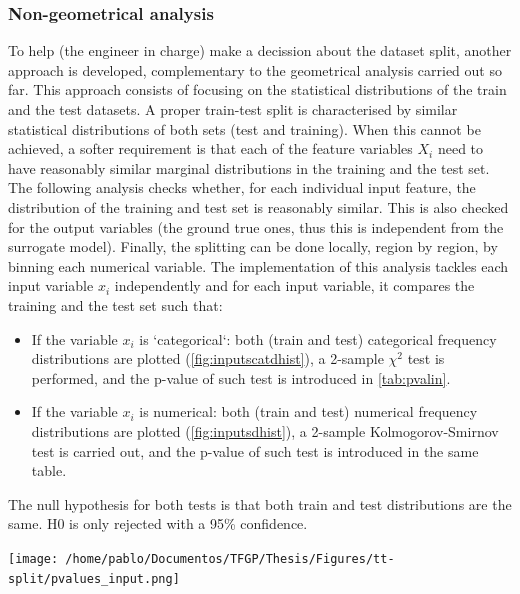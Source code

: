 \subsubsection{Non-geometrical analysis}
\indent To help (the engineer in charge) make a decission about the dataset split, another approach is developed, complementary to the geometrical analysis carried out so far. This approach consists of focusing on the statistical distributions of the train and the test datasets. A proper train-test split is characterised by similar statistical distributions of both sets (test and training)\cite{bonnasse2022interpolation}. When this cannot be achieved, a softer requirement is that each of the feature variables $X_i$ need to have reasonably similar marginal distributions in the training and the test set.\\
%
\indent The following analysis checks whether, for each individual input feature, the distribution of the training and test set is reasonably similar. This is also checked for the output variables (the ground true ones, thus this is independent from the surrogate model). Finally, the splitting can be done locally, \ie region by region, by binning each numerical variable. The implementation of this analysis tackles each input variable $x_i$ independently and for each input variable, it compares the training and the test set such that:
\begin{itemize}
	\item If the variable $x_i$ is `categorical`: both (train and test) categorical frequency distributions are plotted (\autoref{fig:inputscatdhist}), a 2-sample $\chi^2$ test\cite[p. 431]{velez1994calculo} is performed, and the p-value of such test is introduced in \autoref{tab:pvalin}.
	\item If the variable $x_i$ is numerical: both (train and test) numerical frequency distributions are plotted (\autoref{fig:inputsdhist}), a 2-sample Kolmogorov-Smirnov test\cite[p. 454]{velez1994calculo} is carried out, and the p-value of such test is introduced in the same table.\\
\end{itemize}
%
\indent The null hypothesis for both tests is that both train and test distributions are the same. H0 is only rejected with a 95\% confidence.\\
%
\begin{table}[!htb]
	\centering
	\label{tab:pvalin}
	\texttt{[image: /home/pablo/Documentos/TFGP/Thesis/Figures/tt-split/pvalues\_input.png]}
\end{table}

